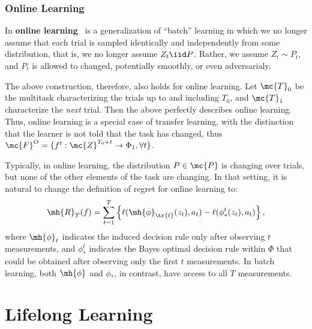 \documentclass{article}
\begin{document}
\subsubsection{Online Learning}

In \textbf{online learning}~\cite{Mohri2018-tf} is a generalization of ``batch'' learning in which we no longer assume that each trial is sampled identically and independently from some distribution, that is, we no longer assume $Z_t \iid P$.  Rather, we assume $Z_t \sim P_t$, and $P_t$ is allowed to changed, potentially smoothly, or even adversarialy. 

The above construction, therefore, also holds for {online learning}.  Let $\mc{T}_0$ be the multitask characterizing the trials up to and including $T_0$, and $\mc{T}_1$ characterize the \emph{next} trial.  Then the above perfectly describes online learning. Thus, online learning is a special case of transfer learning, with the  distinction that the learner is not told that the task has changed, thus $\mc{F}^{O}=\{ f^t: \mc{Z}^{T_0+t}  \to \Phi_1, \forall t\}$.


Typically, in online learning, the distribution $P \in \mc{P}$ is changing over trials, but none of the other elements of the task are changing.  In that setting, it is natural to change the definition of regret for online learning to:
\begin{align} %
    \mh{R}_T(f) = \sum_{t=1}^T  \left\{ \ell(\mh{\phi}_{\tr{t}}(z_t),a_t) - \ell(\phi_*^t(z_t),a_t) \right\},
\end{align}
where $\mh{\phi}_t$ indicates the induced decision rule only after observing $t$ measurements, and $\phi_*^t$ indicates the Bayes optimal decision rule within $\Phi$ that could be obtained after observing only the first $t$ measurements.  In batch learning, both $\mh{\phi}$ and $\phi_*$, in contrast, have access to all $T$ measurements. 

 

\section{Lifelong Learning}
\end{document}

